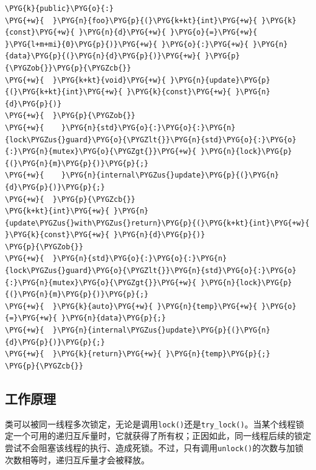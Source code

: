 \begin{codeblockbg}
\begin{Verbatim}[commandchars=\\\{\},breaklines=true,breakanywhere=true,fontsize=\codefont,xleftmargin=17bp]
\PYG{k}{public}\PYG{o}{:}
\PYG{+w}{  }\PYG{n}{foo}\PYG{p}{(}\PYG{k+kt}{int}\PYG{+w}{ }\PYG{k}{const}\PYG{+w}{ }\PYG{n}{d}\PYG{+w}{ }\PYG{o}{=}\PYG{+w}{ }\PYG{l+m+mi}{0}\PYG{p}{)}\PYG{+w}{ }\PYG{o}{:}\PYG{+w}{ }\PYG{n}{data}\PYG{p}{(}\PYG{n}{d}\PYG{p}{)}\PYG{+w}{ }\PYG{p}{\PYGZob{}}\PYG{p}{\PYGZcb{}}
\PYG{+w}{  }\PYG{k+kt}{void}\PYG{+w}{ }\PYG{n}{update}\PYG{p}{(}\PYG{k+kt}{int}\PYG{+w}{ }\PYG{k}{const}\PYG{+w}{ }\PYG{n}{d}\PYG{p}{)}
\PYG{+w}{  }\PYG{p}{\PYGZob{}}
\PYG{+w}{    }\PYG{n}{std}\PYG{o}{:}\PYG{o}{:}\PYG{n}{lock\PYGZus{}guard}\PYG{o}{\PYGZlt{}}\PYG{n}{std}\PYG{o}{:}\PYG{o}{:}\PYG{n}{mutex}\PYG{o}{\PYGZgt{}}\PYG{+w}{ }\PYG{n}{lock}\PYG{p}{(}\PYG{n}{m}\PYG{p}{)}\PYG{p}{;}
\PYG{+w}{    }\PYG{n}{internal\PYGZus{}update}\PYG{p}{(}\PYG{n}{d}\PYG{p}{)}\PYG{p}{;}
\PYG{+w}{  }\PYG{p}{\PYGZcb{}}
\PYG{k+kt}{int}\PYG{+w}{ }\PYG{n}{update\PYGZus{}with\PYGZus{}return}\PYG{p}{(}\PYG{k+kt}{int}\PYG{+w}{ }\PYG{k}{const}\PYG{+w}{ }\PYG{n}{d}\PYG{p}{)}
\PYG{p}{\PYGZob{}}
\PYG{+w}{  }\PYG{n}{std}\PYG{o}{:}\PYG{o}{:}\PYG{n}{lock\PYGZus{}guard}\PYG{o}{\PYGZlt{}}\PYG{n}{std}\PYG{o}{:}\PYG{o}{:}\PYG{n}{mutex}\PYG{o}{\PYGZgt{}}\PYG{+w}{ }\PYG{n}{lock}\PYG{p}{(}\PYG{n}{m}\PYG{p}{)}\PYG{p}{;}
\PYG{+w}{  }\PYG{k}{auto}\PYG{+w}{ }\PYG{n}{temp}\PYG{+w}{ }\PYG{o}{=}\PYG{+w}{ }\PYG{n}{data}\PYG{p}{;}
\PYG{+w}{  }\PYG{n}{internal\PYGZus{}update}\PYG{p}{(}\PYG{n}{d}\PYG{p}{)}\PYG{p}{;}
\PYG{+w}{  }\PYG{k}{return}\PYG{+w}{ }\PYG{n}{temp}\PYG{p}{;}
\PYG{p}{\PYGZcb{}}
\end{Verbatim}
\end{codeblockbg}



\subsection{工作原理}



类可以被同一线程多次锁定，无论是调用\texttt{lock()}还是\texttt{try\_\allowbreak{}lock()}。当某个线程锁定一个可用的递归互斥量时，它就获得了所有权；正因如此，同一线程后续的锁定尝试不会阻塞该线程的执行、造成死锁。不过，只有调用\texttt{unlock()}的次数与加锁次数相等时，递归互斥量才会被释放。



